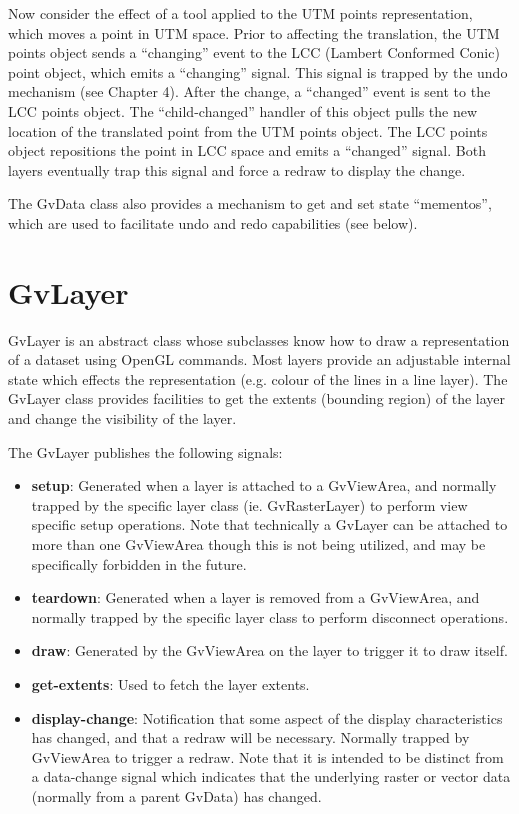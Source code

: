 \documentclass{openevreport}
\begin{document}
Now consider the effect of a tool applied to the UTM points
representation, which moves a point in UTM space.  Prior to
affecting the translation, the UTM points object sends a ``changing''
event to the LCC (Lambert Conformed Conic) point object, which emits a ``changing'' signal.
This signal is trapped by the undo mechanism (see Chapter 4).  After the
change, a ``changed'' event is sent to the LCC points object.  The
``child-changed'' handler of this object pulls the new location of the 
translated point from the UTM points object.  The LCC points object
repositions the point in LCC space and emits a ``changed'' signal.
Both layers eventually trap this signal and force a redraw to display
the change.

The GvData class also provides a mechanism to get and set state
``mementos'', which are used to facilitate undo and redo capabilities
(see below).

\section{GvLayer}

GvLayer is an abstract class whose subclasses know how to draw a
representation of a dataset using OpenGL commands.  Most layers
provide an adjustable internal state which effects the representation
(e.g. colour of the lines in a line layer).  The GvLayer class
provides facilities to get the extents (bounding region) of the layer
and change the visibility of the layer.

The GvLayer publishes the following signals:
\begin{itemize}
\item {\bf setup}: Generated when a layer is attached to a GvViewArea, 
and normally trapped by the specific layer class (ie. GvRasterLayer) to 
perform view specific setup operations.  Note that technically a GvLayer 
can be attached to more than one GvViewArea though this is not being
utilized, and may be specifically forbidden in the future. 

\item {\bf teardown}: Generated when a layer is removed from a GvViewArea,
and normally trapped by the specific layer class to perform disconnect
operations. 

\item {\bf draw}: Generated by the GvViewArea on the layer to trigger
it to draw itself.

\item {\bf get-extents}: Used to fetch the layer extents.

\item {\bf display-change}: Notification that some aspect of the display
characteristics has changed, and that a redraw will be necessary.  Normally
trapped by GvViewArea to trigger a redraw.  Note that it is intended to 
be distinct from a data-change signal which indicates that the underlying
raster or vector data (normally from a parent GvData) has changed. 

\end{itemize}
\end{document}
